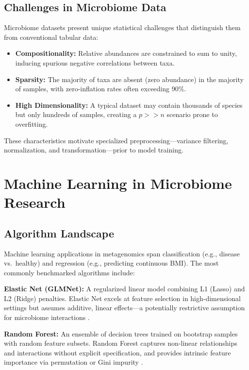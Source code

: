 \subsection{Challenges in Microbiome Data}

Microbiome datasets present unique statistical challenges that distinguish them from conventional tabular data:

\begin{itemize}
    \item \textbf{Compositionality:} Relative abundances are constrained to sum to unity, inducing spurious negative correlations between taxa.
    \item \textbf{Sparsity:} The majority of taxa are absent (zero abundance) in the majority of samples, with zero-inflation rates often exceeding 90\%.
    \item \textbf{High Dimensionality:} A typical dataset may contain thousands of species but only hundreds of samples, creating a $p >> n$ scenario prone to overfitting.
\end{itemize}

These characteristics motivate specialized preprocessing---variance filtering, normalization, and transformation---prior to model training.

\section{Machine Learning in Microbiome Research}

\subsection{Algorithm Landscape}

Machine learning applications in metagenomics span classification (e.g., disease vs.\ healthy) and regression (e.g., predicting continuous BMI). The most commonly benchmarked algorithms include:

\textbf{Elastic Net (GLMNet):} A regularized linear model combining L1 (Lasso) and L2 (Ridge) penalties. Elastic Net excels at feature selection in high-dimensional settings but assumes additive, linear effects---a potentially restrictive assumption for microbiome interactions \cite{zou2005regularization}.

\textbf{Random Forest:} An ensemble of decision trees trained on bootstrap samples with random feature subsets. Random Forest captures non-linear relationships and interactions without explicit specification, and provides intrinsic feature importance via permutation or Gini impurity \cite{breiman2001random}.


